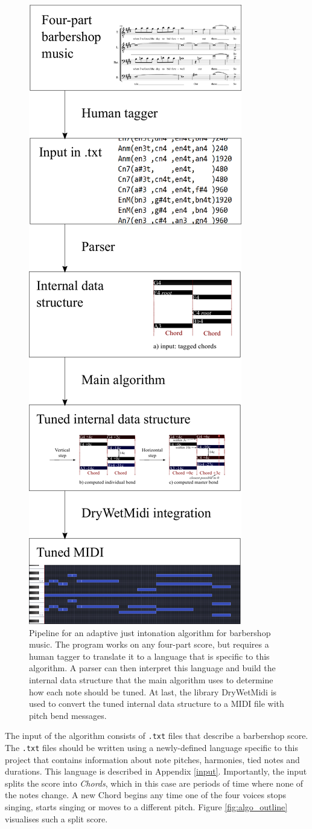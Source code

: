 \documentclass[a4paper]{article}
\begin{document}
\begin{figure}
	\centering
	\includegraphics[width=0.5\linewidth]{Figures/pipeline.pdf}
	\caption{Pipeline for an adaptive just intonation algorithm for barbershop music. The program works on any four-part score, but requires a human tagger to translate it to a language that is specific to this algorithm. A parser can then interpret this language and build the internal data structure that the main algorithm uses to determine how each note should be tuned. At last, the library DryWetMidi is used to convert the tuned internal data structure to a MIDI file with pitch bend messages.}
	\label{fig:pipeline}
\end{figure}

The input of the algorithm consists of \verb+.txt+ files that describe a barbershop score. The \verb+.txt+ files should be written using a newly-defined language specific to this project that contains information about note pitches, harmonies, tied notes and durations. This language is described in Appendix \ref{input}. Importantly, the input splits the score into \textit{Chords}, which in this case are periods of time where none of the notes change. A new Chord begins any time one of the four voices stops singing, starts singing or moves to a different pitch. Figure \ref{fig:algo_outline} visualises such a split score.
\end{document}
